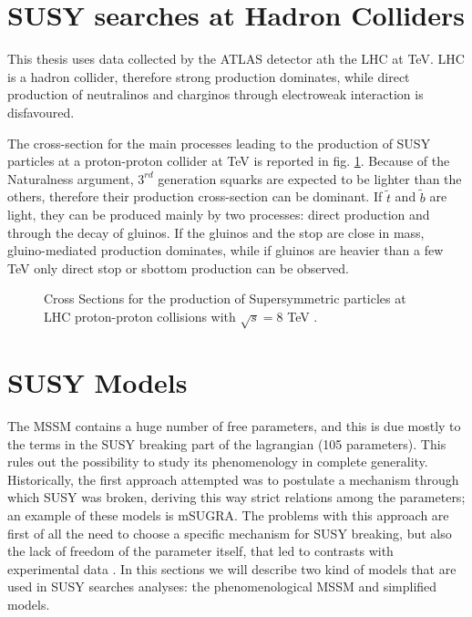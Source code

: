 \section{SUSY searches at Hadron Colliders}

This thesis uses data collected by the ATLAS detector ath the LHC at \cmotto TeV. LHC is a hadron collider, therefore strong production dominates, while direct production of neutralinos and charginos through electroweak interaction is disfavoured.

The cross-section for the main processes leading to the production of SUSY particles at a proton-proton collider at \cmotto TeV is reported in fig. \ref{fig:SUSYxsec}. Because of the Naturalness argument, $3^{rd}$ generation squarks are expected to be lighter than the others, therefore their production cross-section can be dominant. If $\tilde{t}$ and $\tilde{b}$ are light, they can be produced mainly by two processes: direct production and through the decay of gluinos. If the gluinos and the stop are close in mass, gluino-mediated production dominates, while if gluinos are heavier than a few TeV only direct stop or sbottom production can be observed.

\begin{figure}
\begin{center}
\end{center}
\caption[Cross Sections for the production of SUSY particles at LHC]{Cross Sections for the production of Supersymmetric particles at LHC proton-proton collisions with $\sqrt{s}= 8$ TeV \cite{Beenakker:xsec_1} \cite{Beenakker:xsec_2}.}
\label{fig:SUSYxsec}
\end{figure}


\section{SUSY Models}

The MSSM contains a huge number of free parameters, and this is due mostly to the terms in the SUSY breaking part of the lagrangian (105 parameters). This rules out the possibility to study its phenomenology in complete generality. Historically, the first approach attempted was to postulate a mechanism through which SUSY was broken, deriving this way strict relations among the parameters; an example of these models is mSUGRA. The problems with this approach are first of all the need to choose a specific mechanism for SUSY breaking, but also the lack of freedom of the parameter itself, that led to contrasts with experimental data \cite{Cahill-Rowley:pMSSM}. In this sections we will describe two kind of models that are used in SUSY searches analyses: the phenomenological MSSM and simplified models.

